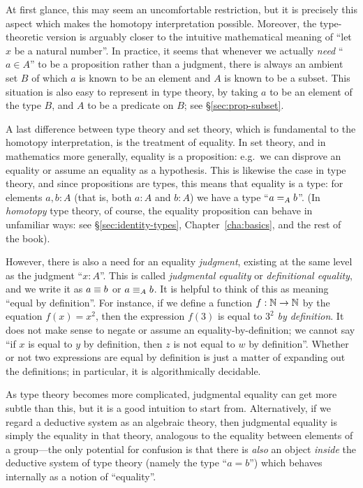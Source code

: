 At first glance, this may seem an uncomfortable restriction, but it is precisely this aspect which makes the homotopy interpretation possible.
Moreover, the type-theoretic version is arguably closer to the intuitive mathematical meaning of ``let $x$ be a natural number''.
In practice, it seems that whenever we actually \emph{need} ``$a\in A$'' to be a proposition rather than a judgment, there is always an ambient set $B$ of which $a$ is known to be an element and $A$ is known to be a subset.
This situation is also easy to represent in type theory, by taking $a$ to be an element of the type $B$, and $A$ to be a predicate on $B$; see \S\ref{sec:prop-subset}.

A last difference between type theory and set theory, which is fundamental to the homotopy interpretation, is the treatment of equality.
In set theory, and in mathematics more generally, equality is a proposition: e.g.\ we can disprove an equality or assume an equality as a hypothesis.
This is likewise the case in type theory, and since propositions are types, this means that equality is a type: for elements $a,b:A$ (that is, both $a:A$ and $b:A$) we have a type ``$\id[A]ab$''.
(In \emph{homotopy} type theory, of course, the equality proposition can behave in unfamiliar ways: see \S\ref{sec:identity-types}, Chapter~\ref{cha:basics}, and the rest of the book).

However, there is also a need for an equality \emph{judgment}, existing at the same level as the judgment ``$x:A$''.
This is called \emph{judgmental equality} or \emph{definitional equality}, and we write it as $a\jdeq b$ or $a \jdeq_A b$.
It is helpful to think of this as meaning ``equal by definition''.
For instance, if we define a function $f:\nat\to\nat$ by the equation $f(x)=x^2$, then the expression $f(3)$ is equal to $3^2$ \emph{by definition}.
It does not make sense to negate or assume an equality-by-definition; we cannot say ``if $x$ is equal to $y$ by definition, then $z$ is not equal to $w$ by definition''.
Whether or not two expressions are equal by definition is just a matter of expanding out the definitions; in particular, it is algorithmically decidable.

As type theory becomes more complicated, judgmental equality can get more subtle than this, but it is a good intuition to start from.
Alternatively, if we regard a deductive system as an algebraic theory, then judgmental equality is simply the equality in that theory, analogous to the equality between elements of a group---the only potential for confusion is that there is \emph{also} an object \emph{inside} the deductive system of type theory (namely the type ``$a=b$'') which behaves internally as a notion of ``equality''.

